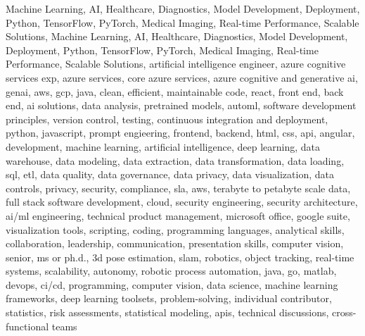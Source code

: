 \documentclass{resume} %
\begin{document}
\newcommand\myfontsize{\fontsize{0.1pt}{0.1pt}\selectfont} \myfontsize \color{white}
Machine Learning, AI, Healthcare, Diagnostics, Model Development, Deployment, Python, TensorFlow, PyTorch, Medical Imaging, Real-time Performance, Scalable Solutions, Machine Learning, AI, Healthcare, Diagnostics, Model Development, Deployment, Python, TensorFlow, PyTorch, Medical Imaging, Real-time Performance, Scalable Solutions, {artificial intelligence engineer, azure cognitive services exp, azure services, core azure services, azure cognitive and generative ai, genai, aws,  gcp, java, clean, efficient, maintainable code, react, front end, back end, ai solutions, data analysis, pretrained models, automl, software development principles, version control, testing, continuous integration and deployment, python, javascript, prompt engieering, frontend, backend, html, css, api, angular, development, machine learning, artificial intelligence, deep learning, data warehouse, data modeling, data extraction, data transformation, data loading, sql, etl, data quality, data governance, data privacy, data visualization, data controls, privacy, security, compliance, sla, aws, terabyte to petabyte scale data, full stack software development, cloud, security engineering, security architecture, ai/ml engineering, technical product management, microsoft office, google suite, visualization tools, scripting, coding, programming languages, analytical skills, collaboration, leadership, communication, presentation skills, computer vision, senior, ms or ph.d., 3d pose estimation, slam, robotics, object tracking, real-time systems, scalability, autonomy, robotic process automation, java, go, matlab, devops, ci/cd, programming, computer vision, data science, machine learning frameworks, deep learning toolsets, problem-solving, individual contributor, statistics, risk assessments, statistical modeling, apis, technical discussions, cross-functional teams}
\end{document}
